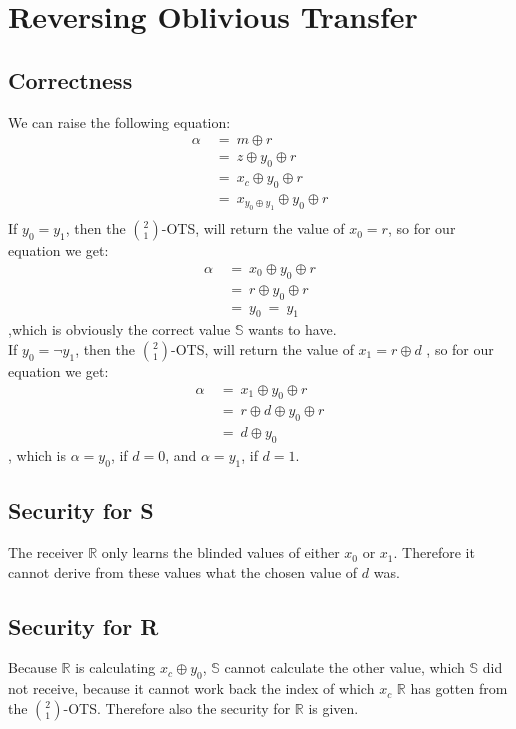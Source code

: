 \documentclass{report}
\begin{document}
	\section{Reversing Oblivious Transfer}
	\startsection
		\subsection{Correctness}
		\startsubsection
			We can raise the following equation:
			\begin{align*}
				\alpha \ & = \ m \oplus r \\
				& = \ z \oplus y_0 \oplus r \\
				& = \ x_c \oplus y_0 \oplus r \\
				& = \ x_{y_0 \oplus y_1} \oplus y_0 \oplus r \\
			\end{align*}
			If $y_0 = y_1$, then the $\binom{2}{1}$-OTS, will return the value of $x_0 = r$, so for our equation we get:
			\begin{align*}
				\alpha \ & = \ x_0 \oplus y_0 \oplus r \\
				& = \ r \oplus y_0 \oplus r \\
				& = \ y_0 \ = \ y_1
			\end{align*}
			,which is obviously the correct value $\mathbb{S}$ wants to have. \\
			If $y_0 = \neg y_1$, then the $\binom{2}{1}$-OTS, will return the value of $x_1 = r \oplus d$ , so for our equation we get:
			\begin{align*}
				\alpha \ & = \ x_1 \oplus y_0 \oplus r \\
				& = \ r \oplus d \oplus y_0 \oplus r \\
				& = \ d \oplus y_0
			\end{align*}
			, which is $\alpha = y_0$, if $d = 0$, and $\alpha = y_1$, if $d = 1$.
		\closesection
		\subsection{Security for S}
		\startsubsection
			The receiver $\mathbb{R}$ only learns the blinded values of either $x_0$ or $x_1$. Therefore it cannot derive from these values what the chosen value of $d$ was. 
		\closesection
		\subsection{Security for R}
		\startsubsection
			Because $\mathbb{R}$ is calculating $x_c \oplus y_0$, $\mathbb{S}$ cannot calculate the other value, which $\mathbb{S}$ did not receive, because it cannot work back the index of which $x_c$ $\mathbb{R}$ has gotten from the $\binom{2}{1}$-OTS. Therefore also the security for $\mathbb{R}$ is given.
		\closesection
	\closesection
	\newpage
\end{document}
